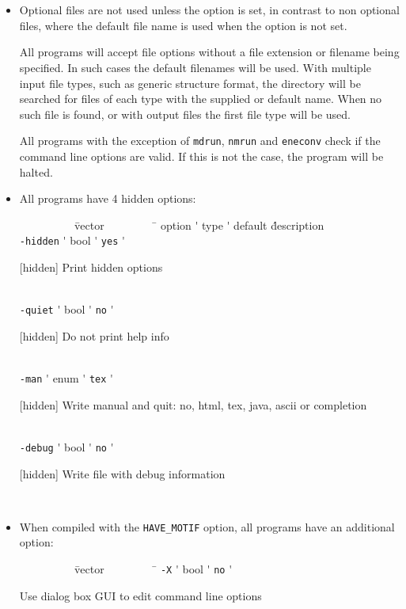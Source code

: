 \section{}

\begin{itemize}
\item
Optional files are not used unless the option is set, in contrast to
non optional files, where the default file name is used when the
option is not set.

All {\gromacs} programs will accept file options without a file extension
or filename being specified. In such cases the default filenames will
be used. With multiple input file types, such as generic structure
format, the directory will be searched for files of each type with the
supplied or default name. When no such file is found, or with output
files the first file type will be used.

All {\gromacs} programs with the exception of {\tt mdrun},
{\tt nmrun} and {\tt eneconv} check if the command line options
are valid. If this is not the case, the program will be halted.

\item
All {\gromacs} programs have 4 hidden options:\\
\vspace{-5ex}
\begin{tabbing}
{\tt ~~~~~~~~~} \= vector \= {\tt ~~~~~~~~} \= \kill
\> option \'\> type \'\> default \' description \\
\> {\tt -hidden} \'\> bool \'\> {\tt    yes} \' \parbox[t]{0.7\linewidth}{[hidden] Print hidden options}\\
\> {\tt -quiet} \'\> bool \'\> {\tt     no} \' \parbox[t]{0.7\linewidth}{[hidden] Do not print help info}\\
\> {\tt -man} \'\> enum \'\> {\tt tex} \' \parbox[t]{0.7\linewidth}{[hidden] Write manual and quit: no, html, tex, java, ascii or completion}\\
\> {\tt -debug} \'\> bool \'\> {\tt     no} \' \parbox[t]{0.7\linewidth}{[hidden] Write file with debug information}\\
\end{tabbing}
\vspace{-5ex}

\item
When compiled with the {\tt HAVE\_MOTIF} option, all {\gromacs} programs
have an additional option:\\
\vspace{-5ex}
\begin{tabbing}
{\tt ~~~~~~~~~} \= vector \= {\tt ~~~~~~~~} \= \kill
\> {\tt -X} \'\> bool \'\> {\tt     no} \' \parbox[t]{0.7\linewidth}{Use dialog box GUI to edit command line options}\\
\end{tabbing}
\vspace{-5ex}


\end{itemize}
